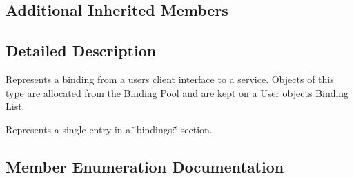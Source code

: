 \subsection*{Additional Inherited Members}


\subsection{Detailed Description}
Represents a binding from a user\textquotesingle{}s client interface to a service. Objects of this type are allocated from the Binding Pool and are kept on a User object\textquotesingle{}s Binding List.

Represents a single entry in a \char`\"{}bindings\+:\char`\"{} section. 

\subsection{Member Enumeration Documentation}
